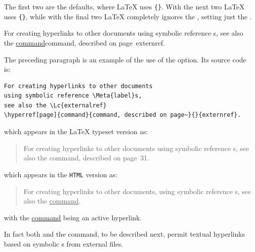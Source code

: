 \noindent
The first two are the defaults, where \LaTeX{} 
uses \verb|{|\verb|}|.
With the next two \LaTeX{} uses \verb|{|\verb|}|,
while with the final two \LaTeX{} completely ignores the ,
setting just the .

\medskip
{}%
\html{\\}\noindent
For creating hyperlinks to other documents
using symbolic reference s, 
see also the  
\hyperref[page]{command}{command, described on page~}{}{externref}.

\medskip\noindent
The preceding paragraph is an example of the use of the  option.
Its source code is:
\begin{small}
\begin{verbatim}
For creating hyperlinks to other documents
using symbolic reference \Meta{label}s, 
see also the \Lc{externalref} 
\hyperref[page]{command}{command, described on page~}{}{externref}.
\end{verbatim}
\end{small}
\begin{htmlonly}
which appears in the \LaTeX{} typeset version as:
\begin{quote}
For creating hyperlinks to other documents
using symbolic reference s, see also the
 command, described on page~31.
\end{quote}
\end{htmlonly}
\begin{latexonly}
which appears in the \texttt{HTML} version as:
\begin{quote}
For creating hyperlinks to other documents, using symbolic reference s, 
see also the  \underline{command}.
\end{quote}
with the \underline{command} being an active hyperlink.
\end{latexonly}
\smallskip\noindent
In fact both  and the  command, to be described next,
permit textual hyperlinks based on symbolic s from external files.


%
